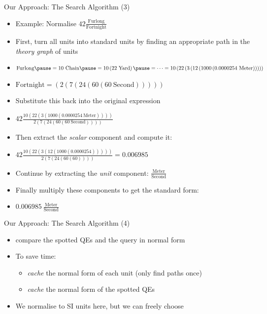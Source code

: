 \documentclass{beamer}
\begin{document}
  \begin{frame}{Our Approach: The Search Algorithm (3)}
    \begin{itemize}[<+->]
      \item Example: Normalise $42 \frac{\text{Furlong}}{\text{Fortnight}}$
      \item First, turn all units into standard units by finding an appropriate path in the \textit{theory graph} of units
      \item $\text{Furlong} \pause = 10\ \text{Chain} \pause = 10 \left( 22\ \text{Yard}\right) \pause = \dots = 10 \left( 22 \left( 3 \left( 12 \left( 1000 \left( 0.0000254\ \text{Meter} \right) \right) \right) \right)\right) $
      \item $\text{Fortnight} = \left( 2 \left( 7 \left( 24 \left( 60 \left( 60\ \text{Second} \right) \right) \right) \right) \right) $
      \item Substitute this back into the original expression
      \item $42 \frac{10 \left( 22 \left( 3 \left( 1000 \left( 0.0000254\ \text{Meter} \right) \right) \right)\right)}{ 2 \left( 7 \left( 24 \left( 60 \left( 60\ \text{Second} \right) \right) \right) \right)}$
      \item Then extract the \textit{scalar} component and compute it:
      \item $ 42 \frac{10 \left( 22 \left( 3 \left( 12 \left( 1000 \left( 0.0000254 \right) \right) \right) \right)\right)}{ 2 \left( 7 \left( 24 \left( 60 \left( 60\right) \right) \right) \right)} = 0.006985 $
      \item Continue by extracting the \textit{unit} component: $\frac{\text{Meter}}{\text{Second}}$
      \item Finally multiply these components to get the standard form:
      \item $0.006985\ \frac{\text{Meter}}{\text{Second}}$
    \end{itemize}
  \end{frame}

  \begin{frame}{Our Approach: The Search Algorithm (4)}
    \begin{itemize}[<+->]
      \item compare the spotted QEs and the query in normal form
      \item To save time:
      \begin{itemize}
        \item \textit{cache} the normal form of each unit (only find paths once)
        \item \textit{cache} the normal form of the spotted QEs
      \end{itemize}
      \item We normalise to SI units here, but we can freely choose
    \end{itemize}
  \end{frame}
\end{document}
